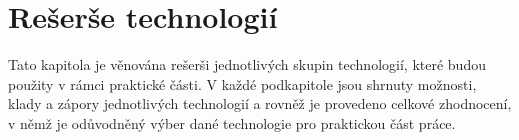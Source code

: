 \chapter{Rešerše technologií}

Tato kapitola je věnována rešerši jednotlivých skupin technologií,
které budou použity v rámci praktické části.
V každé podkapitole jsou shrnuty možnosti, klady a zápory jednotlivých
technologií a rovněž je provedeno celkové zhodnocení,
v němž je odůvodněný výber dané technologie pro praktickou část práce.







